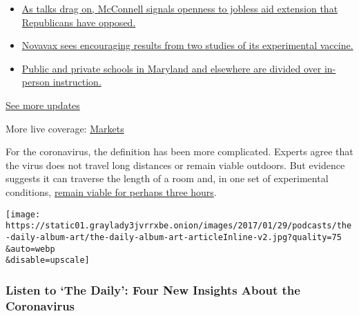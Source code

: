 \begin{itemize}
\tightlist
\item
  \href{https://www.nytimes3xbfgragh.onion/2020/08/04/world/coronavirus-cases.html?action=click\&pgtype=Article\&state=default\&region=MAIN_CONTENT_1\&context=storylines_live_updates\#link-2daa96b5}{As
  talks drag on, McConnell signals openness to jobless aid extension
  that Republicans have opposed.}
\item
  \href{https://www.nytimes3xbfgragh.onion/2020/08/04/world/coronavirus-cases.html?action=click\&pgtype=Article\&state=default\&region=MAIN_CONTENT_1\&context=storylines_live_updates\#link-1228a480}{Novavax
  sees encouraging results from two studies of its experimental
  vaccine.}
\item
  \href{https://www.nytimes3xbfgragh.onion/2020/08/04/world/coronavirus-cases.html?action=click\&pgtype=Article\&state=default\&region=MAIN_CONTENT_1\&context=storylines_live_updates\#link-4825b93}{Public
  and private schools in Maryland and elsewhere are divided over
  in-person instruction.}
\end{itemize}

\href{https://www.nytimes3xbfgragh.onion/2020/08/04/world/coronavirus-cases.html?action=click\&pgtype=Article\&state=default\&region=MAIN_CONTENT_1\&context=storylines_live_updates}{See
more updates}

More live coverage:
\href{https://www.nytimes3xbfgragh.onion/live/2020/08/04/business/stock-market-today-coronavirus?action=click\&pgtype=Article\&state=default\&region=MAIN_CONTENT_1\&context=storylines_live_updates}{Markets}

For the coronavirus, the definition has been more complicated. Experts
agree that the virus does not travel long distances or remain viable
outdoors. But evidence suggests it can traverse the length of a room
and, in one set of experimental conditions,
\href{https://www.nytimes3xbfgragh.onion/2020/03/17/health/coronavirus-surfaces-aerosols.html}{remain
viable for perhaps three hours}.

\texttt{[image: https://static01.graylady3jvrrxbe.onion/images/2017/01/29/podcasts/the-daily-album-art/the-daily-album-art-articleInline-v2.jpg?quality=75\\\&auto=webp\\\&disable=upscale]}

\hypertarget{listen-to-the-daily-four-new-insights-about-the-coronavirus}{%
\subsubsection{Listen to `The Daily': Four New Insights About the
Coronavirus}\label{listen-to-the-daily-four-new-insights-about-the-coronavirus}}

